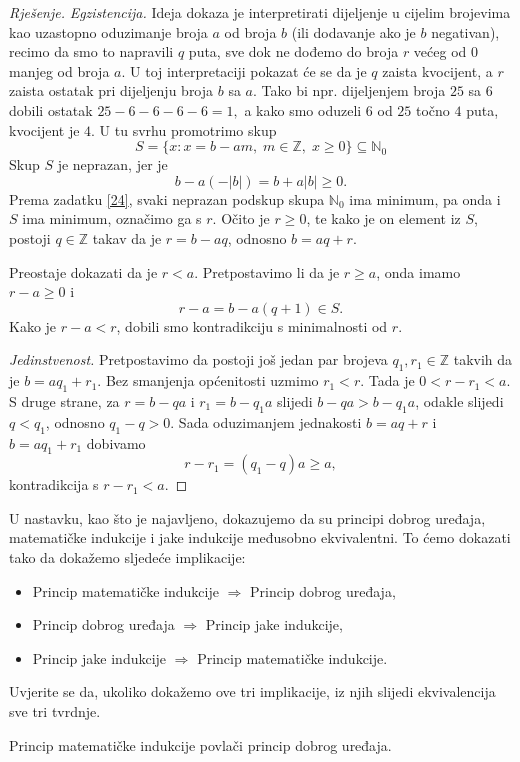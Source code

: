 \begin{proof}[Rješenje]
\textit{Egzistencija.} Ideja dokaza je interpretirati dijeljenje u cijelim brojevima kao uzastopno oduzimanje broja $a$ od broja $b$ (ili dodavanje ako je $b$ negativan), recimo da smo to napravili $q$ puta, sve dok ne dođemo do broja $r$ većeg od $0$ manjeg od broja $a$. U toj interpretaciji pokazat će se da je $q$ zaista kvocijent, a $r$ zaista ostatak pri dijeljenju broja $b$ sa $a$. Tako bi npr. dijeljenjem broja $25$ sa $6$ dobili ostatak $25-6-6-6-6=1,$ a kako smo oduzeli $6$ od $25$ točno $4$ puta, kvocijent je $4$. U tu svrhu promotrimo skup
$$S=\{x : x=b-am,\; m\in \mathbb{Z},\; x\geq 0\}\subseteq \mathbb{N}_0$$
Skup $S$ je neprazan, jer je $$b-a(-|b|)=b+a|b|\geq 0.$$ 
Prema zadatku \ref{24}, svaki neprazan podskup skupa $\mathbb{N}_0$ ima minimum, pa onda i $S$ ima minimum, označimo ga s $r$. Očito je $r\geq 0$, te kako je on element iz $S$, postoji $q\in \mathbb{Z}$ takav da je $r=b-aq$, odnosno $b=aq+r$. 

Preostaje dokazati da je $r<a$. Pretpostavimo li da je $r\geq a$, onda imamo $r-a\geq 0$ i $$r-a=b-a(q+1)\in S.$$ 
Kako je $r-a<r$, dobili smo kontradikciju s minimalnosti od $r$.

\textit{Jedinstvenost.} Pretpostavimo da postoji još jedan par brojeva $q_1, r_1\in \mathbb{Z}$ takvih da je $b=aq_1+r_1$. Bez smanjenja općenitosti uzmimo $r_1<r$. Tada je $0<r-r_1<a$. S druge strane, za $r=b-qa$ i $r_1=b-q_1a$ slijedi $b-qa>b-q_1a$, odakle slijedi $q<q_1$, odnosno $q_1-q>0$. Sada oduzimanjem jednakosti $b=aq+r$ i $b=aq_1+r_1$ dobivamo $$r-r_1=(q_1-q)a\geq a,$$ 
kontradikcija s $r-r_1<a$.
\end{proof}
U nastavku, kao što je najavljeno, dokazujemo da su principi dobrog uređaja, matematičke indukcije i jake indukcije međusobno ekvivalentni. To ćemo dokazati tako da dokažemo sljedeće implikacije:
\begin{itemize}
\item Princip matematičke indukcije $\Rightarrow$ Princip dobrog uređaja,
\item Princip dobrog uređaja $\Rightarrow$ Princip jake indukcije,
\item Princip jake indukcije $\Rightarrow$ Princip matematičke indukcije.
\end{itemize}
Uvjerite se da, ukoliko dokažemo ove tri implikacije, iz njih slijedi ekvivalencija sve tri tvrdnje.
\begin{exercise}
Princip matematičke indukcije povlači princip dobrog uređaja.
\end{exercise}
